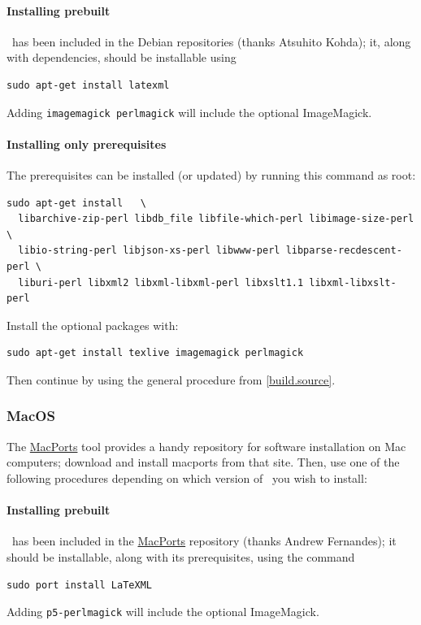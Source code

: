 \documentclass{article}
\begin{document}
\paragraph{Installing prebuilt}
\LaTeXML\ has been included in the Debian repositories (thanks Atsuhito Kohda);
it, along with dependencies, should be installable using
\begin{lstlisting}[style=shell]
sudo apt-get install latexml
\end{lstlisting}
Adding \texttt{imagemagick perlmagick} will include the optional ImageMagick.

\paragraph{Installing only prerequisites}
The prerequisites can be installed (or updated) by running this command as root: 
\begin{lstlisting}[style=shell]
sudo apt-get install   \
  libarchive-zip-perl libdb_file libfile-which-perl libimage-size-perl \
  libio-string-perl libjson-xs-perl libwww-perl libparse-recdescent-perl \
  liburi-perl libxml2 libxml-libxml-perl libxslt1.1 libxml-libxslt-perl
\end{lstlisting}
Install the optional packages with:
\begin{lstlisting}[style=shell]
sudo apt-get install texlive imagemagick perlmagick 
\end{lstlisting}
Then continue by using the general procedure from \ref{build.source}.


\subsubsection{MacOS}\label{install.macos}\index{macintosh}
The \href{http://www.macports.org}{MacPorts} tool provides a handy
repository for software installation on Mac computers;
download and install macports from that site.
Then, use one of the following procedures depending on which version
of \LaTeXML\ you wish to install:

\paragraph{Installing prebuilt}
\LaTeXML\ has been included in the \href{http://www.macports.org}{MacPorts}
repository (thanks Andrew Fernandes);
it should be installable, along with its prerequisites, using the command
\begin{lstlisting}[style=shell]
sudo port install LaTeXML
\end{lstlisting}
Adding \texttt{p5-perlmagick} will include the optional ImageMagick.
\end{document}

